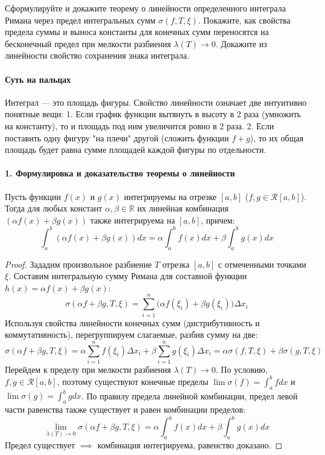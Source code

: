 
{Сформулируйте и докажите теорему о линейности определенного интеграла Римана через предел интегральных сумм $\sigma(f,T,\xi)$. Покажите, как свойства предела суммы и выноса константы для конечных сумм переносятся на бесконечный предел при мелкости разбиения $\lambda(T)\rightarrow0$. Докажите из линейности свойство сохранения знака интеграла.}

\paragraph{Суть на пальцах}
Интеграл — это площадь фигуры. Свойство линейности означает две интуитивно понятные вещи:
1. Если график функции вытянуть в высоту в 2 раза (умножить на константу), то и площадь под ним увеличится ровно в 2 раза.
2. Если поставить одну фигуру "на плечи" другой (сложить функции $f+g$), то их общая площадь будет равна сумме площадей каждой фигуры по отдельности. 

\paragraph{1. Формулировка и доказательство теоремы о линейности}
Пусть функции $f(x)$ и $g(x)$ интегрируемы на отрезке $[a, b]$ ($f, g \in \mathcal{R}[a, b]$). Тогда для любых констант $\alpha, \beta \in \mathbb{R}$ их линейная комбинация $(\alpha f(x) + \beta g(x))$ также интегрируема на $[a, b]$, причем:
$$ \int_a^b (\alpha f(x) + \beta g(x)) dx = \alpha \int_a^b f(x) dx + \beta \int_a^b g(x) dx $$

\begin{proof}
Зададим произвольное разбиение $T$ отрезка $[a, b]$ с отмеченными точками $\xi$. Составим интегральную сумму Римана для составной функции $h(x) = \alpha f(x) + \beta g(x)$:
$$ \sigma(\alpha f + \beta g, T, \xi) = \sum_{i=1}^n \big(\alpha f(\xi_i) + \beta g(\xi_i)\big) \Delta x_i $$
Используя свойства линейности конечных сумм (дистрибутивность и коммутативность), перегруппируем слагаемые, разбив сумму на две:
$$ \sigma(\alpha f + \beta g, T, \xi) = \alpha \sum_{i=1}^n f(\xi_i) \Delta x_i + \beta \sum_{i=1}^n g(\xi_i) \Delta x_i = \alpha \sigma(f, T, \xi) + \beta \sigma(g, T, \xi) $$
Перейдем к пределу при мелкости разбиения $\lambda(T) \to 0$. По условию, $f, g \in \mathcal{R}[a, b]$, поэтому существуют конечные пределы $\lim \sigma(f) = \int_a^b f dx$ и $\lim \sigma(g) = \int_a^b g dx$.
По правилу предела линейной комбинации, предел левой части равенства также существует и равен комбинации пределов:
$$ \lim_{\lambda(T)\to0} \sigma(\alpha f + \beta g, T, \xi) = \alpha \int_a^b f(x) dx + \beta \int_a^b g(x) dx $$
Предел существует $\implies$ комбинация интегрируема, равенство доказано.
\end{proof}

